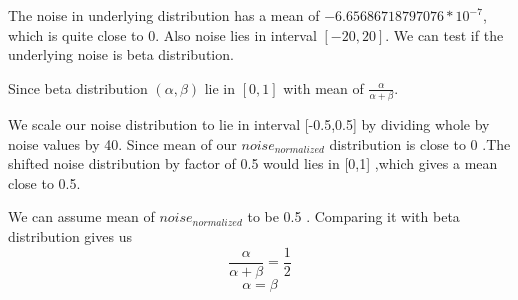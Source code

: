 \documentclass[11pt]{beamer}
\begin{document}
\begin{frame}
The noise in underlying distribution has a mean of $-6.65686718797076 *10^{-7}$, which is quite close to 0. Also noise lies in interval $[-20,20]$. We can test if the underlying noise is beta distribution.

Since beta distribution $ (\alpha,\beta)$ lie in $[0,1]$ with mean of $\frac{\alpha}{\alpha+\beta}$. 

We scale our noise distribution to lie in interval [-0.5,0.5] by dividing whole by noise values by 40.
Since mean of our  $noise_{normalized}$ distribution is close to 0 .The shifted noise distribution by factor of 0.5 would lies in [0,1] ,which gives a mean close to 0.5.

We can assume mean of $noise_{normalized}$ to be 0.5 . Comparing it with beta distribution gives us 
$$\frac{\alpha}{\alpha+\beta}=\frac{1}{2}$$
$$\alpha=\beta$$


\end{frame}
\end{document}
